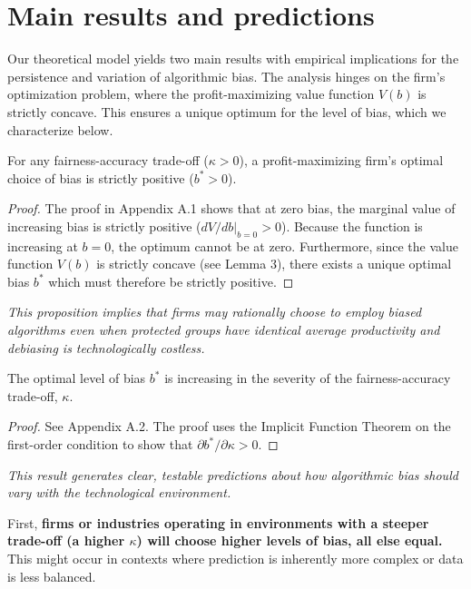 \section{Main results and predictions}

Our theoretical model yields two main results with empirical implications for the persistence and variation of algorithmic bias. The analysis hinges on the firm's optimization problem, where the profit-maximizing value function $V(b)$ is strictly concave. This ensures a unique optimum for the level of bias, which we characterize below.

\begin{proposition}
\label{prop:existence}
    For any fairness-accuracy trade-off ($\kappa > 0$), a profit-maximizing firm's optimal choice of bias is strictly positive ($b^* > 0$).
\end{proposition}

\begin{proof}
    The proof in Appendix A.1 shows that at zero bias, the marginal value of increasing bias is strictly positive ($dV/db|_{b=0} > 0$). Because the function is increasing at $b=0$, the optimum cannot be at zero. Furthermore, since the value function $V(b)$ is strictly concave (see Lemma 3), there exists a unique optimal bias $b^*$ which must therefore be strictly positive.
\end{proof}

\textit{This proposition implies that firms may rationally choose to employ biased algorithms even when protected groups have identical average productivity and debiasing is technologically costless.}

\begin{proposition}
    \label{prop:comparative_static}
    The optimal level of bias $b^*$ is increasing in the severity of the fairness-accuracy trade-off, $\kappa$.
\end{proposition}

\begin{proof}
See Appendix A.2. The proof uses the Implicit Function Theorem on the first-order condition to show that $\partial b^*/\partial \kappa > 0$.
\end{proof}

\textit{This result generates clear, testable predictions about how algorithmic bias should vary with the technological environment.}

First, \textbf{firms or industries operating in environments with a steeper trade-off (a higher $\kappa$) will choose higher levels of bias, all else equal.} This might occur in contexts where prediction is inherently more complex or data is less balanced.

